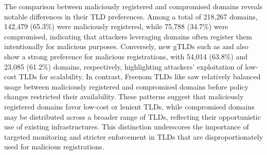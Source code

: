 

The comparison between maliciously registered and compromised domains reveals notable differences in their TLD preferences. 
Among a total of 218,267  domains, 142,479 (65.3\%) were maliciously registered, while 75,788 (34.7\%) were compromised, indicating that attackers leveraging  domains often register them intentionally for malicious purposes. 
Conversely, new gTLDs such as  and  also show a strong preference for malicious registrations, with 54,014 (63.8\%) and 23,085 (61.2\%) domains, respectively, highlighting attackers’ exploitation of low-cost TLDs for scalability. 
In contrast, Freenom TLDs like  saw relatively balanced usage between maliciously registered and compromised domains before policy changes restricted their availability. 
These patterns suggest that maliciously registered domains favor low-cost or lenient TLDs, while compromised domains may be distributed across a broader range of TLDs, reflecting their opportunistic use of existing infrastructures. 
This distinction underscores the importance of targeted monitoring and stricter enforcement in TLDs that are disproportionately used for malicious registrations.

